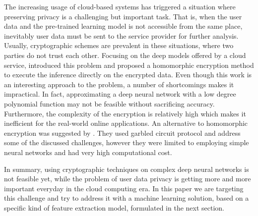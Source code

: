 \documentclass[10pt,journal,compsoc]{IEEEtran}
\begin{document}
The increasing usage of cloud-based systems has triggered a situation where preserving privacy is a challenging but important task. That is, when the user data and the pre-trained learning model is not accessible from the same place, inevitably user data must be sent to the service provider for further analysis. Usually, cryptographic schemes are prevalent in these situations, where two parties do not trust each other. Focusing on the deep models offered by a cloud service, \cite{gilad2016} introduced this problem and proposed a homomorphic encryption method to execute the inference directly on the encrypted data. Even though this work is an interesting approach to the problem, a number of shortcomings makes it impractical. In fact, approximating a deep neural network with a low degree polynomial function may not be feasible without sacrificing accuracy. Furthermore, the complexity of the encryption is relatively high which makes it inefficient for the real-world online applications. %
An alternative to homomorphic encryption was suggested by \cite{rouhani2017}. They used garbled circuit protocol and address some of the discussed challenges, however they were limited to employing simple neural networks and had very high computational cost. 

In summary, using cryptographic techniques on complex deep neural networks is not feasible yet, while the problem of user data privacy is getting more and more important everyday in the cloud computing era. In this paper we are targeting this challenge and try to address it with a machine learning solution, based on a specific kind of feature extraction model, formulated in the next section.
\end{document}
